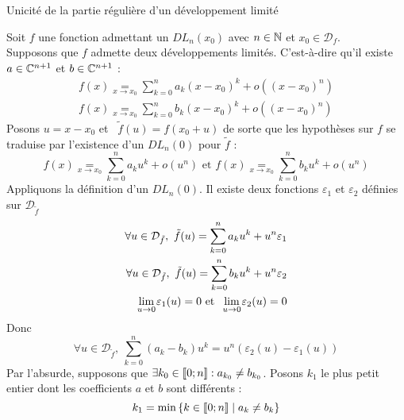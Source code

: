 \documentclass{article}
\renewenvironment{question_kholle}[2][ ]
{
	\subsection{\texorpdfstring{#2}{}}
	\notblank{#1}
	{
		\noindent #1
		\bigbreak
	}
	{}
	\begin{proof}
}
{
	\end{proof}
}
\begin{document}
\begin{question_kholle}
	{Unicité de la partie régulière d'un développement limité}

	Soit $f$ une fonction admettant un $DL_n(x_0)$ avec $n \in \mathbb N$ et $x_0 \in \mathcal{D}_f$. \\
	Supposons que $f$ admette deux développements limités. C'est-à-dire qu'il existe $a \in \mathbb C^{n+1}$ et $b \in \mathbb C^{n+1}$ \tqs :
	\begin{equation*}
		\begin{aligned}
			f(x) \underset{x \rightarrow x_0}{=} \sum_{k=0}^{n} a_k (x - x_0)^k + o\left((x-x_0)^n\right) \\
			f(x) \underset{x \rightarrow x_0}{=} \sum_{k=0}^{n} b_k (x - x_0)^k + o\left((x-x_0)^n\right)
		\end{aligned}
	\end{equation*}
	Posons $u = x - x_0$ et  $\tilde{f}(u) = f(x_0+u)$ de sorte que les hypothèses sur $f$ se traduise par l'existence d'un $DL_n(0)$ pour $\tilde{f}$ :
	\begin{equation*}
		f(x) \underset{x \rightarrow x_0}{=} \sum_{k=0}^{n} a_k u^k + o\left(u^n\right)
		\text{ et }
		f(x) \underset{x \rightarrow x_0}{=} \sum_{k=0}^{n} b_k u^k + o\left(u^n\right)
	\end{equation*}
	Appliquons la définition d'un $DL_n(0)$. Il existe deux fonctions $\varepsilon_1$ et $\varepsilon_2$ définies sur $\mathcal{D}_{\tilde{f}}$ \tqs
	\begin{equation*}
		\begin{aligned}
			\forall u \in \mathcal{D}_{\tilde{f}}, \ \tilde{f}(u) = \sum_{k=0}^{n} a_k u^k + u^n \varepsilon_1 \\
			\forall u \in \mathcal{D}_{\tilde{f}}, \ \tilde{f}(u) = \sum_{k=0}^{n} b_k u^k + u^n \varepsilon_2 \\
			\lim\limits_{\;u \to 0\;}\!\! \varepsilon_1(u) = 0 \text{ et } \lim\limits_{\;u \to 0\;}\!\! \varepsilon_2(u) = 0
		\end{aligned}
	\end{equation*}
	Donc
	\begin{equation*}
		\forall u \in \mathcal{D}_{\tilde{f}}, \
		\sum_{k=0}^{n} (a_k - b_k) u^k = u^n \left( \varepsilon_2(u) - \varepsilon_1(u) \right)
	\end{equation*}
	Par l'absurde, supposons que $\exists k_0 \in [\![ 0; n ]\!] : a_{k_0} \neq b_{k_0}$. Posons $k_1$ le plus petit entier dont les coefficients $a$ et $b$ sont différents :
	\begin{equation*}
		k_1 = \min \left\{ k \in \lient 0;n \rient \;|\; a_k \neq b_k \right\}

\end{equation*}
\end{question_kholle}
\end{document}
